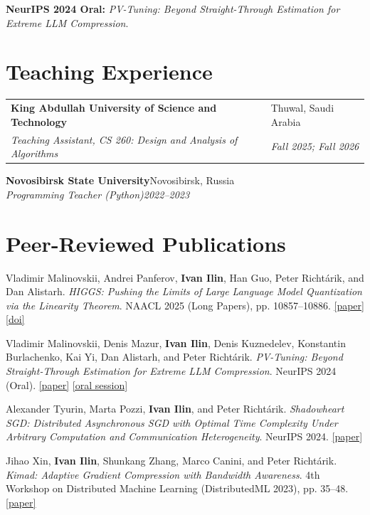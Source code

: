 \documentclass[10pt,letterpaper]{article}
\makeatletter
\newcommand{\cventry}[4]{%
  \begin{tabularx}{\textwidth}{@{}>{\raggedright\arraybackslash}X>{\raggedleft\arraybackslash}p{1.52in}@{}}
    \textbf{#1} & \textcolor{Muted}{#2} \\
    \textit{#3} & \textit{\textcolor{Muted}{#4}}
  \end{tabularx}\vspace{0.12em}
}
\newcommand{\cvdetail}[1]{%
  {\small #1\par}\vspace{0.30em}
}
\newenvironment{publist}{%
  \begin{enumerate}[
    leftmargin=1.75em,
    label=\textcolor{Muted}{[\arabic*]},
    itemsep=0.34em,
    topsep=0.12em,
    parsep=0pt,
    partopsep=0pt
  ]\small\raggedright
}{%
  \end{enumerate}
}
\makeatother
\begin{document}
\cvdetail{\textbf{NeurIPS 2024 Oral:} \textit{PV-Tuning: Beyond Straight-Through Estimation for Extreme LLM Compression}.}

\section{Teaching Experience}

\cventry{King Abdullah University of Science and Technology}{Thuwal, Saudi Arabia}{Teaching Assistant, CS 260: Design and Analysis of Algorithms}{Fall 2025; Fall 2026}
\vspace{0.28em}

\textbf{Novosibirsk State University}\hfill\textcolor{Muted}{Novosibirsk, Russia}\\
\textit{Programming Teacher (Python)}\hfill\textit{\textcolor{Muted}{2022--2023}}

\newpage
\section{Peer-Reviewed Publications}

\begin{publist}
  \item Vladimir Malinovskii, Andrei Panferov, \textbf{Ivan Ilin}, Han Guo, Peter Richt\'arik, and Dan Alistarh. \textit{HIGGS: Pushing the Limits of Large Language Model Quantization via the Linearity Theorem}. NAACL 2025 (Long Papers), pp. 10857--10886. \href{https://aclanthology.org/2025.naacl-long.543/}{[paper]} \href{https://doi.org/10.18653/v1/2025.naacl-long.543}{[doi]}

  \item Vladimir Malinovskii, Denis Mazur, \textbf{Ivan Ilin}, Denis Kuznedelev, Konstantin Burlachenko, Kai Yi, Dan Alistarh, and Peter Richt\'arik. \textit{PV-Tuning: Beyond Straight-Through Estimation for Extreme LLM Compression}. NeurIPS 2024 (Oral). \href{https://proceedings.neurips.cc/paper_files/paper/2024/hash/091166620a04a289c555f411d8899049-Abstract-Conference.html}{[paper]} \href{https://neurips.cc/virtual/2024/session/98067}{[oral session]}

  \item Alexander Tyurin, Marta Pozzi, \textbf{Ivan Ilin}, and Peter Richt\'arik. \textit{Shadowheart SGD: Distributed Asynchronous SGD with Optimal Time Complexity Under Arbitrary Computation and Communication Heterogeneity}. NeurIPS 2024. \href{https://papers.nips.cc/paper_files/paper/2024/hash/06e2dd57e90a736a5a1fd3bb2bf95c6c-Abstract-Conference.html}{[paper]}

  \item Jihao Xin, \textbf{Ivan Ilin}, Shunkang Zhang, Marco Canini, and Peter Richt\'arik. \textit{Kimad: Adaptive Gradient Compression with Bandwidth Awareness}. 4th Workshop on Distributed Machine Learning (DistributedML 2023), pp. 35--48. \href{https://doi.org/10.1145/3630048.3630184}{[paper]}
\end{publist}
\end{document}
